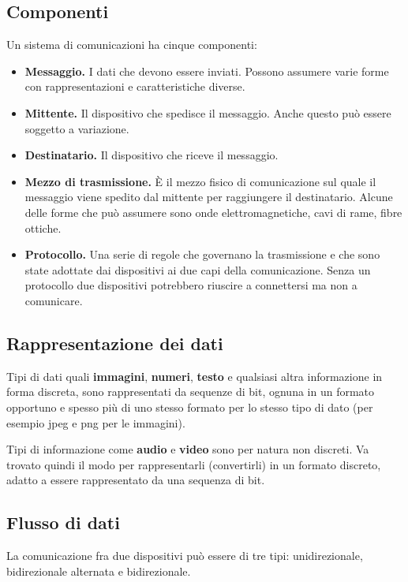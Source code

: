     \subsection{Componenti}
        Un sistema di comunicazioni ha cinque componenti:
        \begin{itemize}
            \item \textbf{Messaggio.} I dati che devono essere inviati. Possono assumere varie forme con rappresentazioni e caratteristiche diverse.
            
            \item \textbf{Mittente.} Il dispositivo che spedisce il messaggio. Anche questo può essere soggetto a variazione.
            
            \item \textbf{Destinatario.} Il dispositivo che riceve il messaggio.
            
            \item \textbf{Mezzo di trasmissione.} È il mezzo fisico di comunicazione sul quale il messaggio viene spedito dal mittente per raggiungere il destinatario. Alcune delle forme che può assumere sono onde elettromagnetiche, cavi di rame, fibre ottiche.
            
            \item \textbf{Protocollo.} Una serie di regole che governano la trasmissione e che sono state adottate dai dispositivi ai due capi della comunicazione. Senza un protocollo due dispositivi potrebbero riuscire a connettersi ma non a comunicare.
        \end{itemize}
        
    \subsection{Rappresentazione dei dati}
        Tipi di dati quali \textbf{immagini}, \textbf{numeri},  \textbf{testo} e qualsiasi altra informazione in forma discreta, sono rappresentati da sequenze di bit, ognuna in un formato opportuno e spesso più di uno stesso formato per lo stesso tipo di dato (per esempio jpeg e png per le immagini).
        
        Tipi di informazione come \textbf{audio} e \textbf{video} sono per natura non discreti. Va trovato quindi il modo per rappresentarli (convertirli) in un formato discreto, adatto a essere rappresentato da una sequenza di bit.
        
    \subsection{Flusso di dati}
        La comunicazione fra due dispositivi può essere di tre tipi: unidirezionale, bidirezionale alternata e bidirezionale.
        
